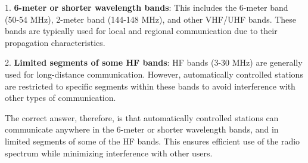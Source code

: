 1. \textbf{6-meter or shorter wavelength bands}: This includes the 6-meter band (50-54 MHz), 2-meter band (144-148 MHz), and other VHF/UHF bands. These bands are typically used for local and regional communication due to their propagation characteristics.

2. \textbf{Limited segments of some HF bands}: HF bands (3-30 MHz) are generally used for long-distance communication. However, automatically controlled stations are restricted to specific segments within these bands to avoid interference with other types of communication.

The correct answer, therefore, is that automatically controlled stations can communicate anywhere in the 6-meter or shorter wavelength bands, and in limited segments of some of the HF bands. This ensures efficient use of the radio spectrum while minimizing interference with other users.

